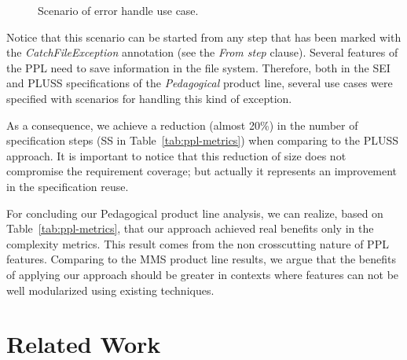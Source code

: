 \documentclass{acm_proc_article-sp}
\begin{document}
\begin{figure}[h]
\caption{Scenario of error handle use case.}
\label{fig:error-handle}
\end{figure}
    
Notice that this scenario can be started from any step that has been marked with the \emph{CatchFileException} annotation (see the \emph{From step} clause). Several features of the PPL need to save information in the file system. Therefore, both in the SEI and PLUSS specifications of the \emph{Pedagogical} product line, several use cases were specified with scenarios for handling this kind of exception.

As a consequence, we achieve a reduction (almost 20\%) in the number of specification steps (SS in Table~\ref{tab:ppl-metrics}) when comparing to the PLUSS approach. It is important to notice that this reduction of size does not compromise the requirement coverage; but actually it represents an improvement in the specification reuse.

For concluding our Pedagogical product line analysis, we can realize, based on Table~\ref{tab:ppl-metrics}, that our approach achieved real benefits only in the complexity metrics. This result comes from the non crosscutting nature of PPL features. Comparing to the MMS product line results, we argue that the benefits of applying our approach should be greater in contexts where features can not be well modularized using existing techniques. 
   
\section{Related Work}
\label{sec:related}
\end{document}
